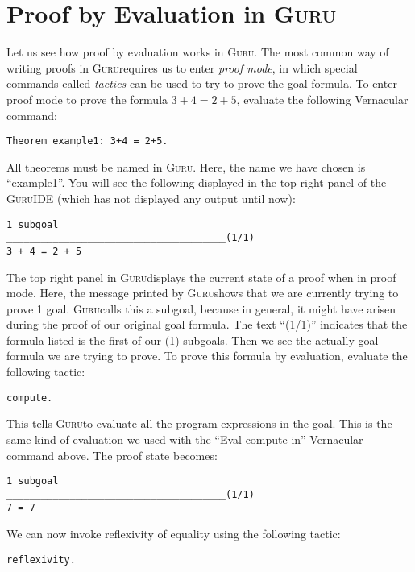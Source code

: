 \documentclass{book}[12pt]
\newcommand{\guru}[0]{\textsc{Guru}}
\begin{document}
\section{Proof by Evaluation in \guru}

Let us see how proof by evaluation works in \guru.  The most common way
of writing proofs in \guru requires us to enter \emph{proof mode}, in
which special commands called \emph{tactics} can be used to try to
prove the goal formula.  To enter proof mode to prove the formula $3+4
= 2+5$, evaluate the following Vernacular command:

\begin{verbatim}
Theorem example1: 3+4 = 2+5.
\end{verbatim}

\noindent All theorems must be named in \guru.  Here, the name we have
chosen is ``example1''.  You will see the following displayed in the
top right panel of the \guru IDE (which has not displayed any output
until now):

\begin{verbatim}
1 subgoal
______________________________________(1/1)
3 + 4 = 2 + 5
\end{verbatim}

\noindent The top right panel in \guru displays the current state of a
proof when in proof mode.  Here, the message printed by \guru shows that
we are currently trying to prove 1 goal.  \guru calls this a subgoal,
because in general, it might have arisen during the proof of our
original goal formula.  The text ``(1/1)'' indicates that the formula
listed is the first of our (1) subgoals.  Then we see the actually
goal formula we are trying to prove.  To prove this formula by evaluation,
evaluate the following tactic:

\begin{verbatim}
compute.
\end{verbatim}

\noindent This tells \guru to evaluate all the program expressions
in the goal.  This is the same kind of evaluation we used with the
``Eval compute in'' Vernacular command above.  The proof state 
becomes:

\begin{verbatim}
1 subgoal
______________________________________(1/1)
7 = 7
\end{verbatim}


\noindent We can now invoke reflexivity of equality using the following
tactic:

\begin{verbatim}
reflexivity.
\end{verbatim}
\end{document}
